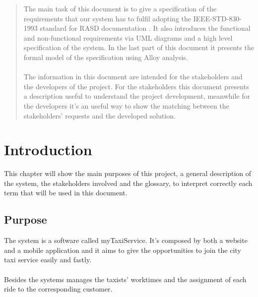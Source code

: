 
\begin{abstract}
The main task of this document is to give a specification of the requirements that our system has to fulfil adopting the IEEE-STD-830-1993 standard for RASD documentation . It also introduces the functional and non-functional requirements via UML diagrams and a high level specification of the system. In the last part of this document it presents the formal model of the specification using Alloy analysis. 
\\
\\
The information in this document are intended for the stakeholders and the developers of the project. For the stakeholders this document presents a description useful to understand the project development, meanwhile for the developers it's an useful way to show the matching between the stakeholders' requests and the developed solution. 
\end{abstract} 

\chapter{Introduction}

\setmyfancystyle

\label{intro}
This chapter will show the main purposes of this project, a general description of the system, the stakeholders involved and the glossary, to interpret correctly each term that will be used in this document.

\section{Purpose}
The system is a software called myTaxiService. It's composed by both a website and a mobile application and it aims to give the opportunities to join the city taxi service easily and fastly.
\\
\\
Besides the systems manages the taxists' worktimes and the assignment of each ride to the corresponding customer.

